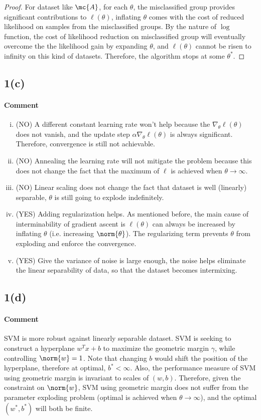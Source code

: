 \documentclass[11pt]{article}
\begin{document}
\begin{proof}
		For dataset like $\mc{A}$, for each $\theta$, the misclassified group provides significant contributions to $\ell(\theta)$, inflating $\theta$ comes with the cost of reduced likelihood on samples from the misclassified groups. By the nature of $\log$ function, the cost of likelihood reduction on misclassified group will eventually overcome the the likelihood gain by expanding $\theta$, and $\ell(\theta)$ cannot be risen to infinity on this kind of datasets. Therefore, the algorithm stops at some $\theta^*$.
	\end{proof}
	\newpage
	\subsection{1(c)}
		\paragraph{Comment}
		\begin{enumerate}[(i)]
			\item (NO) A different constant learning rate won't help because the $\nabla_\theta \ell(\theta)$ does not vanish, and the update step $\alpha \nabla_\theta \ell(\theta)$ is always significant. Therefore, convergence is still not achievable.
			\item (NO) Annealing the learning rate will not mitigate the problem because this does not change the fact that the maximum of $\ell$ is achieved when $\theta \to \infty$.
			\item (NO) Linear scaling does not change the fact that dataset is well (linearly) separable, $\theta$ is still going to explode indefinitely.
			\item (YES) Adding regularization helps. As mentioned before, the main cause of interminability of gradient ascent is $\ell(\theta)$ can always be increased by inflating $\theta$ (i.e. increasing $\norm{\theta}$). The regularizing term prevents $\theta$ from exploding and enforce the convergence.
			\item (YES) Give the variance of noise is large enough, the noise helps eliminate the linear separability of data, so that the dataset becomes intermixing.
		\end{enumerate}
	
	\newpage
	\subsection{1(d)}
	\paragraph{Comment} SVM is more robust against linearly separable dataset. SVM is seeking to construct a hyperplane $w^T x + b$ to maximize the geometric margin $\gamma$, while controlling $\norm{w} = 1$. Note that changing $b$ would shift the position of the hyperplane, therefore at optimal, $b^* < \infty$. Also, the performance measure of SVM using geometric margin is invariant to scales of $(w, b)$. Therefore, given the constraint on $\norm{w}$, SVM using geometric margin does not suffer from the parameter exploding problem (optimal is achieved when $\theta \to \infty$), and the optimal $(w^*, b^*)$ will both be finite.
	
\end{document}
